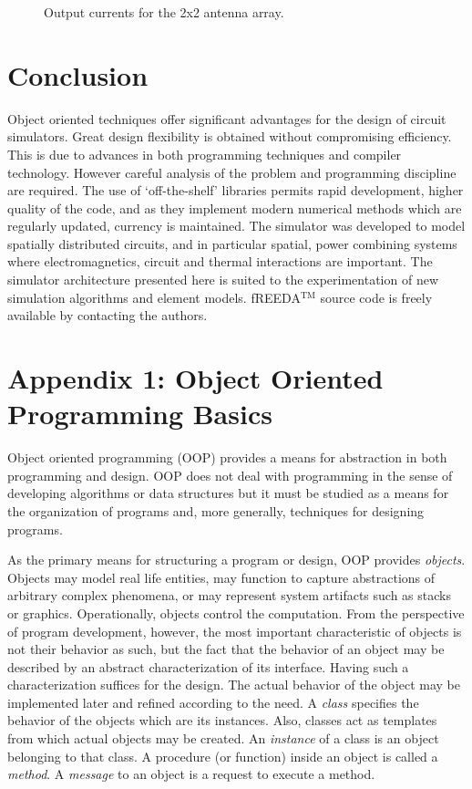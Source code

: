 %
\begin{figure}[htpb]
\centerline{\epsfxsize=13cm }
\caption{Output currents for the 2x2 antenna array.}
\label{fig:2x2out}
\end{figure}
%

\section{Conclusion}

Object oriented techniques offer significant advantages for the design
of circuit simulators.  Great design flexibility is obtained without
compromising efficiency. This is due to advances in both programming
techniques and compiler technology.  However careful analysis of the
problem and programming discipline are required.  The use of
`off-the-shelf' libraries permits rapid development, higher quality of
the code, and as they implement modern numerical methods which are
regularly updated, currency is maintained.  The simulator was
developed to model spatially distributed circuits, and in particular
spatial, power combining systems where electromagnetics, circuit and
thermal interactions are important.  The simulator architecture
presented here is suited to the experimentation of new simulation
algorithms and element models. fREEDA$^{\mathrm{TM}}$ source code is freely available
by contacting the authors.



\section*{Appendix 1: Object Oriented Programming Basics}

Object oriented programming (OOP) \cite{eliens} provides a means for
abstraction in both programming and design. OOP does not deal with
programming in the sense of developing algorithms or data structures
but it must be studied as a means for the organization of programs
and, more generally, techniques for designing programs.

As the primary means for structuring a program or design, OOP provides
\emph{objects}. Objects may model real life entities, may function to
capture abstractions of arbitrary complex phenomena, or may represent
system artifacts such as stacks or graphics.  Operationally, objects
control the computation. From the perspective of program development,
however, the most important characteristic of objects is not their
behavior as such, but the fact that the behavior of an object may be
described by an abstract characterization of its interface. Having
such a characterization suffices for the design. The actual behavior
of the object may be implemented later and refined according to the
need. A \emph{class} specifies the behavior of the objects which are
its instances. Also, classes act as templates from which actual
objects may be created.  An \emph{instance} of a class is an object
belonging to that class. A procedure (or function) inside an object is
called a \emph{method}. A \emph{message} to an object is a request to
execute a method.

